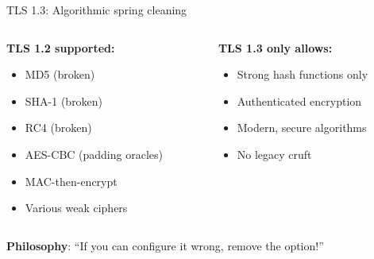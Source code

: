 \documentclass[aspectratio=169, lualatex, handout]{beamer}
\begin{document}
\begin{frame}{TLS 1.3: Algorithmic spring cleaning}
	\begin{columns}[c]
		\begin{column}{0.5\textwidth}
			\textbf{TLS 1.2 supported:}
			\begin{itemize}[<+->]
				\item MD5 (broken)
				\item SHA-1 (broken)
				\item RC4 (broken)
				\item AES-CBC (padding oracles)
				\item MAC-then-encrypt
				\item Various weak ciphers
			\end{itemize}
		\end{column}
		\begin{column}{0.5\textwidth}
			\textbf{TLS 1.3 only allows:}
			\begin{itemize}[<+->]
				\item Strong hash functions only
				\item Authenticated encryption
				\item Modern, secure algorithms
				\item No legacy cruft
			\end{itemize}
		\end{column}
	\end{columns}
	\pause
	\begin{center}
		\textbf{Philosophy}: ``If you can configure it wrong, remove the option!''
	\end{center}
\end{frame}
\end{document}
